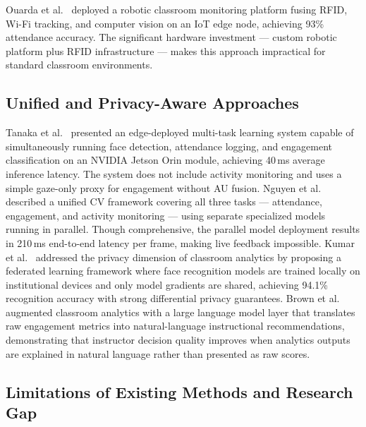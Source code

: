\documentclass[preprint,12pt]{elsarticle}
\begin{document}
Ouarda et al.~\cite{robotic_iot} deployed a robotic classroom monitoring platform fusing RFID, Wi-Fi tracking, and computer vision on an IoT edge node, achieving 93\% attendance accuracy. The significant hardware investment --- custom robotic platform plus RFID infrastructure --- makes this approach impractical for standard classroom environments.

\subsection{Unified and Privacy-Aware Approaches}

Tanaka et al.~\cite{lit_edge_inference_2025} presented an edge-deployed multi-task learning system capable of simultaneously running face detection, attendance logging, and engagement classification on an NVIDIA Jetson Orin module, achieving 40\,ms average inference latency. The system does not include activity monitoring and uses a simple gaze-only proxy for engagement without AU fusion. Nguyen et al.~\cite{lit_unified_pipeline_2025} described a unified CV framework covering all three tasks --- attendance, engagement, and activity monitoring --- using separate specialized models running in parallel. Though comprehensive, the parallel model deployment results in 210\,ms end-to-end latency per frame, making live feedback impossible. Kumar et al.~\cite{lit_privacy_federated_2025} addressed the privacy dimension of classroom analytics by proposing a federated learning framework where face recognition models are trained locally on institutional devices and only model gradients are shared, achieving 94.1\% recognition accuracy with strong differential privacy guarantees. Brown et al.~\cite{lit_llm_analytics_2025} augmented classroom analytics with a large language model layer that translates raw engagement metrics into natural-language instructional recommendations, demonstrating that instructor decision quality improves when analytics outputs are explained in natural language rather than presented as raw scores.

\subsection{Limitations of Existing Methods and Research Gap}
\end{document}
